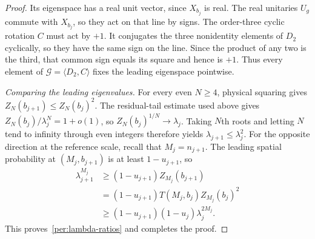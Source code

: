 \begin{proof}
Its eigenspace has a real unit vector, since $X_{b_j}$ is real.
The real unitaries $U_g$ commute with $X_{b_j}$, so they act on that
line by signs.
The order-three cyclic rotation $C$ must act by $+1$.  It conjugates
the three nonidentity elements of $D_2$ cyclically, so they have the
same sign on the line.  Since the product of any two is the third,
that common sign equals its square and hence is $+1$.
Thus every element of $\mathcal G=\langle D_2,C\rangle$ fixes the
leading eigenspace pointwise.

\emph{Comparing the leading eigenvalues.}
For every even $N\ge4$, physical squaring gives
$Z_N(b_{j+1})\le Z_N(b_j)^2$. The residual-tail estimate used above
gives $Z_N(b_j)/\lambda_j^N=1+o(1)$, so
$Z_N(b_j)^{1/N}\to\lambda_j$. Taking $N$th roots and letting $N$
tend to infinity through even integers therefore yields
$\lambda_{j+1}\le\lambda_j^2$.
For the opposite direction at the reference scale, recall that
$M_j=n_{j+1}$.  The leading spatial probability at $(M_j,b_{j+1})$
is at least $1-u_{j+1}$, so
\[
 \begin{split}
 \lambda_{j+1}^{M_j}
 &\ge(1-u_{j+1})Z_{M_j}(b_{j+1})\\
 &= (1-u_{j+1})T(M_j,b_j)Z_{M_j}(b_j)^2\\
 &\ge(1-u_{j+1})(1-u_j)\lambda_j^{2M_j}.
 \end{split}
\]
This proves~\eqref{per:lambda-ratios} and completes the proof.
\end{proof}
